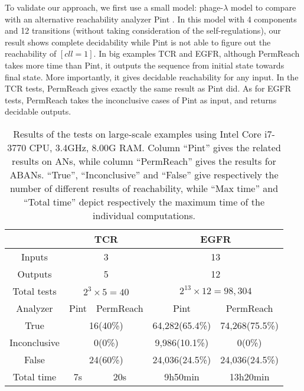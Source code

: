 \documentclass[runningheads]{llncs}
\begin{document}
To validate our approach, we first use a small model: phage-$\lambda$ model \cite{thieffry1995dynamical} to compare with an alternative reachability analyzer Pint \cite{pauleve2012}. In this model with 4 components and 12 transitions (without taking consideration of the self-regulations), our result shows complete decidability while Pint is not able to figure out the reachability of $[cll=1]$. 
In big examples TCR and EGFR,
although PermReach takes more time than Pint, it outputs the sequence from initial state towards final state.
More importantly, it gives decidable reachability for any input. 
In the TCR tests, PermReach gives exactly the same result as Pint did. As for EGFR tests, PermReach takes the inconclusive cases of Pint as input, and returns decidable outputs.


\begin{table}[ht]
\centering
\tiny
\begin{tabular}{|c|c|c|c|c|}
  \hline
			&	  \multicolumn{2}{c|}{TCR} & \multicolumn{2}{c|}{EGFR}  \\
\hline
Inputs	&	  \multicolumn{2}{c|}{3} & \multicolumn{2}{c|}{13}\\
\hline
  Outputs &	  \multicolumn{2}{c|}{5} & \multicolumn{2}{c|}{12} \\
\hline
  Total tests & \multicolumn{2}{c|}{$2^3\times 5=40$} & \multicolumn{2}{c|}{$2^{13}\times 12=98,304$}\\
\hline
Analyzer      &  Pint       &PermReach   &  Pint       &PermReach             \\
\hline
  True       &  \multicolumn{2}{c|}{16(40\%)}  & 64,282(65.4\%)&74,268(75.5\%)\\
\hline
  Inconclusive & \multicolumn{2}{c|}{0(0\%)}    &9,986(10.1\%)&0(0\%)  \\
\hline
  False      &  \multicolumn{2}{c|}{24(60\%)} &24,036(24.5\%)&24,036(24.5\%)\\
\hline
  Total time &  7s       &  20s        & 9h50min              & 13h20min       \\
\hline

\end{tabular}
\caption{Results of the tests on large-scale examples using Intel Core i7-3770 CPU, \@3.4GHz, 8.00G RAM. 
Column “Pint” gives the related results on ANs, while column “PermReach” gives the results for ABANs. 
“True”, “Inconclusive” and “False” give respectively the number of different results of reachability, while “Max time” and “Total time” depict respectively the maximum time of the individual computations.}
\label{tab:2}
\end{table}
\end{document}
